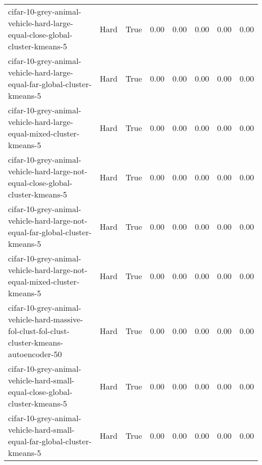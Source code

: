 \begin{longtable}{llllllll}
                                  cifar-10-grey-animal-vehicle-hard-large-equal-close-global-cluster-kmeans-5 &         Hard &        True &                 0.00 &                 0.00 &                         0.00 &                         0.00 &                         0.00 \\
                                    cifar-10-grey-animal-vehicle-hard-large-equal-far-global-cluster-kmeans-5 &         Hard &        True &                 0.00 &                 0.00 &                         0.00 &                         0.00 &                         0.00 \\
                                         cifar-10-grey-animal-vehicle-hard-large-equal-mixed-cluster-kmeans-5 &         Hard &        True &                 0.00 &                 0.00 &                         0.00 &                         0.00 &                         0.00 \\
                              cifar-10-grey-animal-vehicle-hard-large-not-equal-close-global-cluster-kmeans-5 &         Hard &        True &                 0.00 &                 0.00 &                         0.00 &                         0.00 &                         0.00 \\
                                cifar-10-grey-animal-vehicle-hard-large-not-equal-far-global-cluster-kmeans-5 &         Hard &        True &                 0.00 &                 0.00 &                         0.00 &                         0.00 &                         0.00 \\
                                     cifar-10-grey-animal-vehicle-hard-large-not-equal-mixed-cluster-kmeans-5 &         Hard &        True &                 0.00 &                 0.00 &                         0.00 &                         0.00 &                         0.00 \\
                  cifar-10-grey-animal-vehicle-hard-massive-fol-clust-fol-clust-cluster-kmeans-autoencoder-50 &         Hard &        True &                 0.00 &                 0.00 &                         0.00 &                         0.00 &                         0.00 \\
                                  cifar-10-grey-animal-vehicle-hard-small-equal-close-global-cluster-kmeans-5 &         Hard &        True &                 0.00 &                 0.00 &                         0.00 &                         0.00 &                         0.00 \\
                                    cifar-10-grey-animal-vehicle-hard-small-equal-far-global-cluster-kmeans-5 &         Hard &        True &                 0.00 &                 0.00 &                         0.00 &                         0.00 &                         0.00 \\

\end{longtable}
